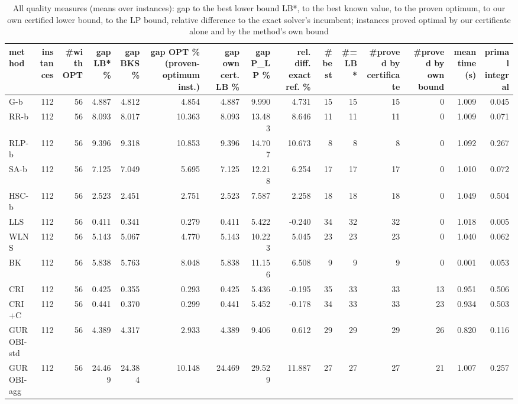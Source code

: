 \begin{table}[htbp]
\centering
\small
\caption{All quality measures (means over instances): gap to the best lower bound LB*, to the best known value, to the proven optimum, to our own certified lower bound, to the LP bound, relative difference to the exact solver's incumbent; instances proved optimal by our certificate alone and by the method's own bound}
\label{tab:E4a_equal_budgets_b1_all_metrics}
\begin{tabular}{lrrrrrrrrrrrrrr}
\toprule
method & instances & \#with OPT & gap LB* \% & gap BKS \% & gap OPT \% (proven-optimum inst.) & gap own cert. LB \% & gap P\_LP \% & rel. diff. exact ref. \% & \#best & \#= LB* & \#proved by certificate & \#proved by own bound & mean time (s) & primal integral \\
\midrule
G-b & 112 & 56 & 4.887 & 4.812 & 4.854 & 4.887 & 9.990 & 4.731 & 15 & 15 & 15 & 0 & 1.009 & 0.045 \\
RR-b & 112 & 56 & 8.093 & 8.017 & 10.363 & 8.093 & 13.483 & 8.646 & 11 & 11 & 11 & 0 & 1.009 & 0.071 \\
RLP-b & 112 & 56 & 9.396 & 9.318 & 10.853 & 9.396 & 14.707 & 10.673 & 8 & 8 & 8 & 0 & 1.092 & 0.267 \\
SA-b & 112 & 56 & 7.125 & 7.049 & 5.695 & 7.125 & 12.218 & 6.254 & 17 & 17 & 17 & 0 & 1.010 & 0.072 \\
HSC-b & 112 & 56 & 2.523 & 2.451 & 2.751 & 2.523 & 7.587 & 2.258 & 18 & 18 & 18 & 0 & 1.049 & 0.504 \\
LLS & 112 & 56 & 0.411 & 0.341 & 0.279 & 0.411 & 5.422 & -0.240 & 34 & 32 & 32 & 0 & 1.018 & 0.005 \\
WLNS & 112 & 56 & 5.143 & 5.067 & 4.770 & 5.143 & 10.223 & 5.045 & 23 & 23 & 23 & 0 & 1.040 & 0.062 \\
BK & 112 & 56 & 5.838 & 5.763 & 8.048 & 5.838 & 11.156 & 6.508 & 9 & 9 & 9 & 0 & 0.001 & 0.053 \\
CRI & 112 & 56 & 0.425 & 0.355 & 0.293 & 0.425 & 5.436 & -0.195 & 35 & 33 & 33 & 13 & 0.951 & 0.506 \\
CRI+C & 112 & 56 & 0.441 & 0.370 & 0.299 & 0.441 & 5.452 & -0.178 & 34 & 33 & 33 & 23 & 0.934 & 0.503 \\
GUROBI-std & 112 & 56 & 4.389 & 4.317 & 2.933 & 4.389 & 9.406 & 0.612 & 29 & 29 & 29 & 26 & 0.820 & 0.116 \\
GUROBI-agg & 112 & 56 & 24.469 & 24.384 & 10.148 & 24.469 & 29.529 & 11.887 & 27 & 27 & 27 & 21 & 1.007 & 0.257 \\
\bottomrule
\end{tabular}
\end{table}
